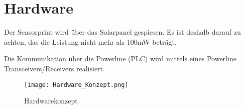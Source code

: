 %
%
%

\section{Hardware}

Der Sensorprint wird über das Solarpanel gespiesen. Es ist deshalb darauf zu achten, das die Leistung nicht mehr als 100mW beträgt.

Die Kommunikation über die Powerline (PLC) wird mittels eines Powerline Transceivers/Receivers realisiert.
\begin{figure}[h]
\texttt{[image: Hardware\_Konzept.png]}%
\caption{Hardwarekonzept}
\label{fig::Hardwarekonzept}%
\end{figure}
%
